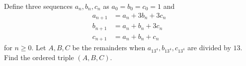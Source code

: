 Define three sequences $a_n,b_n,c_n$ as $a_0=b_0=c_0=1$ and
\begin{align*}
    a_{n+1}&=a_n+3b_n+3c_n \\
    b_{n+1}&=a_n+b_n+3c_n \\
    c_{n+1}&=a_n+b_n+c_n
\end{align*}
for $n\geq0$. Let $A,B,C$ be the remainders when $a_{13^4},b_{13^4},c_{13^4}$ are divided by $13$. Find the ordered triple $\left(A,B,C\right)$.